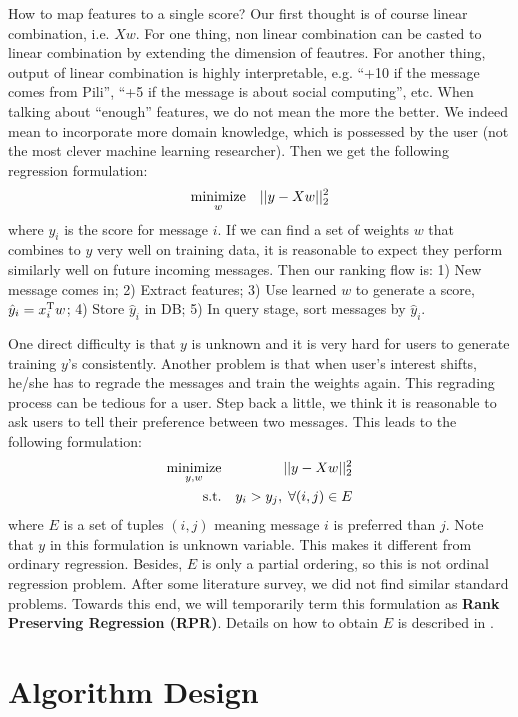 \documentclass{sig-alternate}
\begin{document}
How to map features to a single score? 
Our first thought is of course linear combination, i.e. $Xw$. 
For one thing, non linear combination can be casted 
to linear combination by extending the dimension of feautres. 
For another thing, output of linear combination is highly interpretable, 
e.g. ``+10 if the message comes from Pili'', 
``+5 if the message is about social computing'', etc. 
When talking about ``enough'' features, 
we do not mean the more the better. 
We indeed mean to incorporate more domain knowledge, 
which is possessed by the user
(not the most clever machine learning researcher). 
Then we get the following regression formulation:
\begin{eqnarray}
	\operatorname*{minimize}_{w} && ||y - Xw||_2^2 
\end{eqnarray}
where $y_i$ is the score for message $i$. 
If we can find a set of weights $w$ that combines to $y$
very well on training data, 
it is reasonable to expect they perform similarly well 
on future incoming messages. 
Then our ranking flow is:
1) New message comes in; 
2) Extract features;
3) Use learned $w$ to generate a score, $\hat{y}_i = x_i^\mathrm{T} w$;
4) Store $\hat{y}_i$ in DB; 
5) In query stage, sort messages by $\hat{y}_i$.

One direct difficulty is that $y$ is unknown and 
it is very hard for users to generate training $y$'s consistently. 
Another problem is that when user's interest shifts, 
he/she has to regrade the messages and train the weights again. 
This regrading process can be tedious for a user. 
Step back a little, we think it is reasonable to ask users to
tell their preference between two messages. 
This leads to the following formulation:
\begin{eqnarray}
	\operatorname*{minimize}_{y,w} && ||y - Xw||_2^2 \\
	\text{s.t.} && y_i > y_j, \; \forall (i,j) \in E
\end{eqnarray}
where $E$ is a set of tuples $(i,j)$ meaning message $i$ is preferred than $j$. 
Note that $y$ in this formulation is unknown variable. 
This makes it different from ordinary regression. 
Besides, $E$ is only a partial ordering, so this is not ordinal regression problem. 
After some literature survey, we did not find similar standard problems. 
Towards this end, we will temporarily term this formulation as 
{\bf Rank Preserving Regression (RPR)}.  
Details on how to obtain $E$ is described in 
\rsec{\ref{sec:Induce Preference Relations on Graph}}. 

\section{Algorithm Design}
\label{sec:Algorithm Design}
\end{document}
